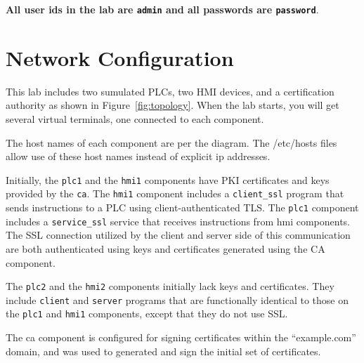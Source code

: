 \textbf{All user ids in the lab are {\tt admin} and all passwords are {\tt password}}.

\section{Network Configuration}
This lab includes two sumulated PLCs, two HMI devices, and a certification
authority as shown in Figure~\ref{fig:topology}.
When the lab starts, you will get several virtual terminals, one connected to each
component.

The host names of each component are per the diagram.  The /etc/hosts files
allow use of these host names instead of explicit ip addresses.

Initially, the {\tt plc1} and the {\tt hmi1} components have PKI certificates
and keys provided by the {\tt ca}.  The {\tt hmi1} component includes a 
{\tt client\_ssl} program that sends instructions to a PLC using client-authenticated
TLS.  The {\tt plc1} component includes a {\tt service\_ssl} service that receives
instructions from hmi components.  The SSL connection utilized by the client and server
side of this communication are both authenticated using keys and certificates 
generated using the CA component.

The {\tt plc2} and the {\tt hmi2} components initially lack keys and certificates.  They
include {\tt client} and {\tt server} programs that are functionally identical to those on the
{\tt plc1} and {\tt hmi1} components, except that they do not use SSL.

The ca component is configured for signing certificates within the ``example.com'' domain,
and was used to generated and sign the initial set of certificates.

